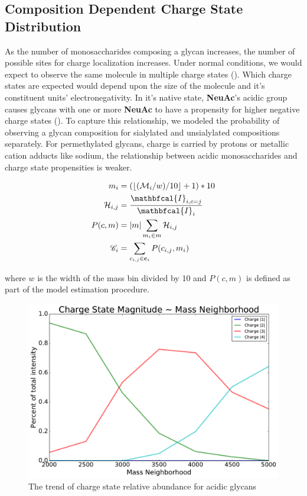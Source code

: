 \documentclass{article}
\DeclarePairedDelimiter\floor{\lfloor}{\rfloor}
\newcommand{\monosaccharide}[1]{{\bf #1}\xspace}
\begin{document}
    \subsection{Composition Dependent Charge State Distribution}
        As the number of monosaccharides composing a glycan increases, the number of possible sites
        for charge localization increases. Under normal conditions, we would expect to observe the
        same molecule in multiple charge states (\cite{Maxwell2012}). Which charge states are
        expected would depend upon the size of the molecule and it's constituent units'
        electronegativity. In it's native state, \monosaccharide{NeuAc}'s acidic group causes
        glycans with one or more \monosaccharide{NeuAc} to have a propensity for higher negative
        charge states (\cite{Varki2009}). To capture this relationship, we modeled the probability of
        observing a glycan composition for sialylated and unsialylated compositions separately. For
        permethylated glycans, charge is carried by protons or metallic cation adducts like sodium,
        the relationship between acidic monosaccharides and charge state propensities is weaker.

        \begin{align}
            m_i &= (\floor*{(\mathcal{M}_i / w) / 10} + 1) * 10 \nonumber\\
            \mathcal{H}_{i,j} &= \frac{
                \mathbfcal{I}_{i, c=j}}{\mathbfcal{I}_i} \nonumber\\
            P(c, m) &= |m|\sum_{m_i \in m} \mathcal{H}_{i, j} \nonumber\\
            \mathscr{C}_i &= \sum_{c_{i, j} \in \mathbf{c}_i}{P(c_{i, j}, m_i)}
        \end{align}

        \noindent where $w$ is the width of the mass bin divided by 10 and $P(c, m)$ is defined as
        part of the model estimation procedure.

        \begin{figure}
            \centering
            \includegraphics[width=0.75\linewidth]{figure/charge_trend_plot}
            \caption{The trend of charge state relative abundance for acidic glycans}
            \label{fig:charge_trend_plot}
        \end{figure}
\end{document}
